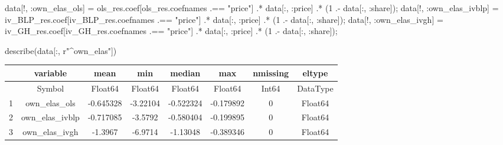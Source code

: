 \documentclass[
  letterpaper,
  DIV=11,
  numbers=noendperiod]{scrreprt}
\newenvironment{Shaded}{\begin{snugshade}}{\end{snugshade}}
\newcommand{\FloatTok}[1]{\textcolor[rgb]{0.68,0.00,0.00}{#1}}
\newcommand{\FunctionTok}[1]{\textcolor[rgb]{0.28,0.35,0.67}{#1}}
\newcommand{\NormalTok}[1]{\textcolor[rgb]{0.00,0.23,0.31}{#1}}
\newcommand{\OperatorTok}[1]{\textcolor[rgb]{0.37,0.37,0.37}{#1}}
\newcommand{\StringTok}[1]{\textcolor[rgb]{0.13,0.47,0.30}{#1}}
\begin{document}
\begin{Shaded}
\begin{Highlighting}[]
\NormalTok{data[!, }\OperatorTok{:}\NormalTok{own\_elas\_ols]   }\OperatorTok{=}\NormalTok{ ols\_res.coef[ols\_res.coefnames }\OperatorTok{.==} \StringTok{"price"}\NormalTok{] }\OperatorTok{.*}\NormalTok{ data[}\OperatorTok{:}\NormalTok{, }\OperatorTok{:}\NormalTok{price] }\OperatorTok{.*}\NormalTok{ (}\FloatTok{1} \OperatorTok{.{-}}\NormalTok{ data[}\OperatorTok{:}\NormalTok{, }\OperatorTok{:}\NormalTok{share]);}
\NormalTok{data[!, }\OperatorTok{:}\NormalTok{own\_elas\_ivblp] }\OperatorTok{=}\NormalTok{ iv\_BLP\_res.coef[iv\_BLP\_res.coefnames }\OperatorTok{.==} \StringTok{"price"}\NormalTok{] }\OperatorTok{.*}\NormalTok{ data[}\OperatorTok{:}\NormalTok{, }\OperatorTok{:}\NormalTok{price] }\OperatorTok{.*}\NormalTok{ (}\FloatTok{1} \OperatorTok{.{-}}\NormalTok{ data[}\OperatorTok{:}\NormalTok{, }\OperatorTok{:}\NormalTok{share]);}
\NormalTok{data[!, }\OperatorTok{:}\NormalTok{own\_elas\_ivgh]  }\OperatorTok{=}\NormalTok{ iv\_GH\_res.coef[iv\_GH\_res.coefnames }\OperatorTok{.==} \StringTok{"price"}\NormalTok{] }\OperatorTok{.*}\NormalTok{ data[}\OperatorTok{:}\NormalTok{, }\OperatorTok{:}\NormalTok{price] }\OperatorTok{.*}\NormalTok{ (}\FloatTok{1} \OperatorTok{.{-}}\NormalTok{ data[}\OperatorTok{:}\NormalTok{, }\OperatorTok{:}\NormalTok{share]);}
\end{Highlighting}
\end{Shaded}

\begin{Shaded}
\begin{Highlighting}[]
\FunctionTok{describe}\NormalTok{(data[}\OperatorTok{:}\NormalTok{, }\StringTok{r"\^{}own\_elas"}\NormalTok{])}
\end{Highlighting}
\end{Shaded}

\begin{tabular}{r|ccccccc}
    & variable & mean & min & median & max & nmissing & eltype\\
    \hline
    & Symbol & Float64 & Float64 & Float64 & Float64 & Int64 & DataType\\
    \hline
    1 & own\_elas\_ols & -0.645328 & -3.22104 & -0.522324 & -0.179892 & 0 & Float64 \\
    2 & own\_elas\_ivblp & -0.717085 & -3.5792 & -0.580404 & -0.199895 & 0 & Float64 \\
    3 & own\_elas\_ivgh & -1.3967 & -6.9714 & -1.13048 & -0.389346 & 0 & Float64 \\
\end{tabular}
\end{document}
